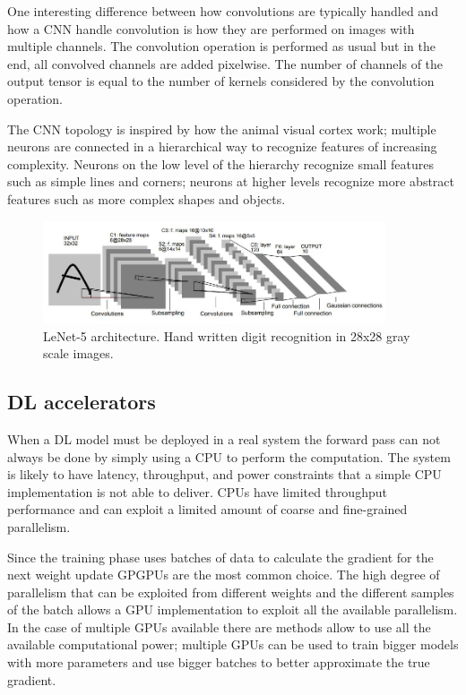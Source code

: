 \documentclass[../main.tex]{subfiles}
\begin{document}
One interesting difference between how convolutions are typically handled and how a CNN handle convolution is how they are performed on images with multiple channels.
The convolution operation is performed as usual but in the end, all convolved channels are added pixelwise.
The number of channels of the output tensor is equal to the number of kernels considered by the convolution operation.

The CNN topology is inspired by how the animal visual cortex work; multiple neurons are connected in a hierarchical way to recognize features of increasing complexity. Neurons on the low level of the hierarchy recognize small features such as simple lines and corners; neurons at higher levels recognize more abstract features such as more complex shapes and objects.

\begin{figure}[h!]
  \includegraphics[width=0.9\textwidth]{images/lenet.jpg}
  \centering
  \caption{LeNet-5 architecture. Hand written digit recognition in 28x28 gray scale images. ~\cite{lenet}}
  \label{fig:lenet}
\end{figure}


\subsection{DL accelerators}

When a DL model must be deployed in a real system the forward pass can not always be done by simply using a CPU to perform the computation. The system is likely to have latency, throughput, and power constraints that a simple CPU implementation is not able to deliver. CPUs have limited throughput performance and can exploit a limited amount of coarse and fine-grained parallelism.

Since the training phase uses batches of data to calculate the gradient for the next weight update GPGPUs are the most common choice.
The high degree of parallelism that can be exploited from different weights and the different samples of the batch allows a GPU implementation to exploit all the available parallelism.
In the case of multiple GPUs available there are methods allow to use all the available computational power; multiple GPUs can be used to train bigger models with more parameters and use bigger batches to better approximate the true gradient.
\end{document}
